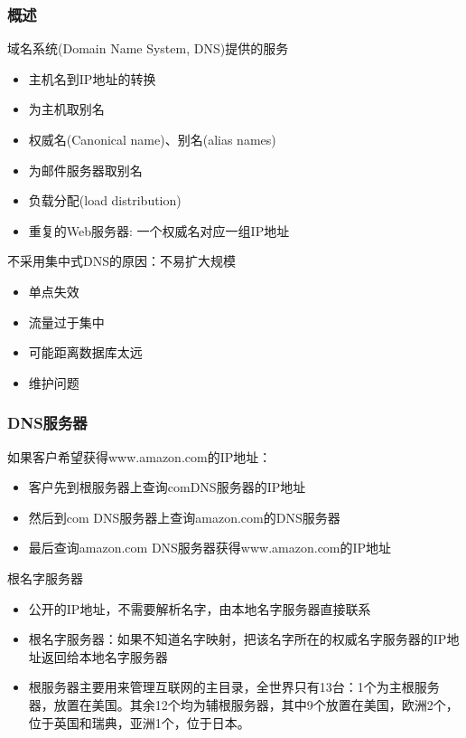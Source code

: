 \subsubsection{概述}
域名系统(Domain Name System, DNS)提供的服务
\begin{itemize}
\item 主机名到IP地址的转换
\item 为主机取别名
\item 权威名(Canonical name)、别名(alias names)
\item 为邮件服务器取别名
\item  负载分配(load distribution)
\item 重复的Web服务器: 一个权威名对应一组IP地址
\end{itemize}

\myhline
不采用集中式DNS的原因：不易扩大规模
\begin{itemize}
\item 单点失效
\item 流量过于集中
\item 可能距离数据库太远
\item 维护问题
\end{itemize}

\subsubsection{DNS服务器}
\begin{example}
如果客户希望获得www.amazon.com的IP地址：
\begin{itemize}
\item 客户先到根服务器上查询comDNS服务器的IP地址
\item 然后到com DNS服务器上查询amazon.com的DNS服务器
\item 最后查询amazon.com DNS服务器获得www.amazon.com的IP地址
\end{itemize}
\end{example}

根名字服务器
\begin{itemize}
\item 公开的IP地址，不需要解析名字，由本地名字服务器直接联系
\item 根名字服务器：如果不知道名字映射，把该名字所在的权威名字服务器的IP地址返回给本地名字服务器
\item 根服务器主要用来管理互联网的主目录，全世界只有13台：1个为主根服务器，放置在美国。其余12个均为辅根服务器，其中9个放置在美国，欧洲2个，位于英国和瑞典，亚洲1个，位于日本。
\end{itemize}


